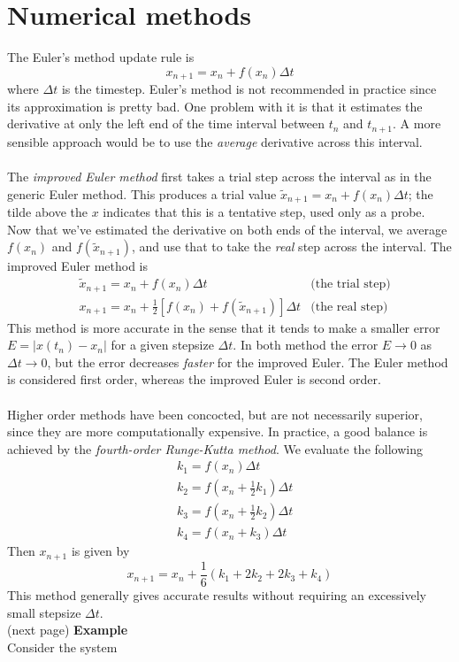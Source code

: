 \documentclass{report}
\theoremstyle{definition}
\begin{document}
\section{Numerical methods}
The Euler's method update rule is
\begin{equation*}
x_{n+1}=x_n+f(x_n)\Delta t
\end{equation*}
where $\Delta t$ is the timestep. Euler's method is not recommended in practice since its approximation is pretty bad. One problem with it is that it estimates the derivative at only the left end
of the time interval between $t_n$ and $t_{n+1}$. A more sensible approach would be to use the 
\textit{average} derivative across this interval.\\
\vspace{1mm}\\
The \textit{improved Euler method} first takes a trial step across the interval as in the generic Euler method. This produces a trial value $\tilde x_{n+1}=x_n+f(x_n)\Delta t$;
the tilde above the $x$ indicates that this is a tentative step, used only as a probe. Now that we've estimated the derivative on both ends of the interval, we average
$f(x_n)$ and $f(\tilde x_{n+1})$, and use that to take the \textit{real} step across the interval.
The improved Euler method is
\begin{align*}
&\tilde x_{n+1}=x_n+f(x_n)\Delta t&\text{(the trial step)}\\
&x_{n+1}=x_n+\frac{1}{2}[f(x_n)+f(\tilde x_{n+1})]\Delta t&\text{(the real step)}
\end{align*}
This method is more accurate in the sense that it tends to make a smaller error $E=|x(t_n)-x_n|$ for a given stepsize $\Delta t$. In both method the error $E\to0$ as $\Delta t\to0$, but the error
decreases \textit{faster} for the improved Euler. The Euler method is considered first order, whereas the improved Euler is second order.\\
\vspace{1mm}\\
Higher order methods have been concocted, but are not necessarily superior, since they are more computationally expensive. In practice, a good balance is achieved by the 
\textit{fourth-order Runge-Kutta method}. We evaluate the following 
\begin{align*}
&k_1=f(x_n)\Delta t\\
&k_2=f(x_n+\frac{1}{2}k_1)\Delta t\\
&k_3=f(x_n+\frac{1}{2}k_2)\Delta t\\
&k_4=f(x_n+k_3)\Delta t
\end{align*}
Then $x_{n+1}$ is given by
\begin{equation*}
x_{n+1}=x_n+\frac{1}{6}(k_1+2k_2+2k_3+k_4)
\end{equation*}
This method generally gives accurate results without requiring an excessively small stepsize $\Delta t$.\\
(next page)\newpage
\noindent\textbf{Example}\\
Consider the system
\end{document}
